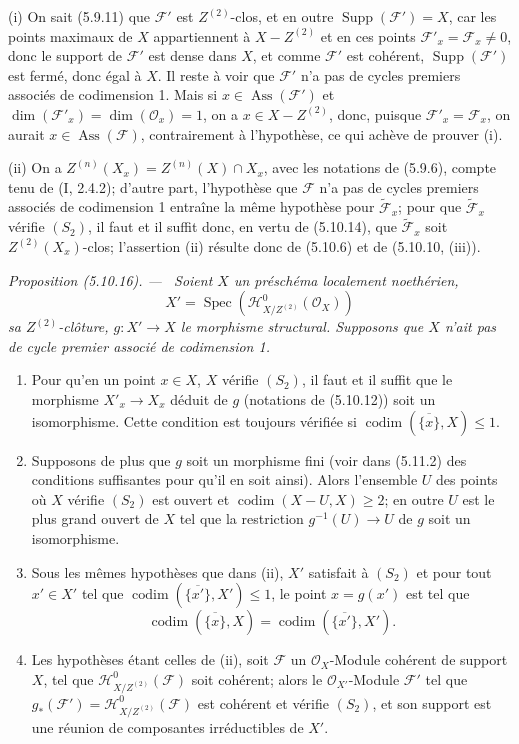 \documentclass[10pt,oneside]{book}
\newenvironment{proposition}[1][]{%
  \par\medskip\noindent\itshape Proposition (#1). ---\ }{\par}
\begin{document}
(i) On sait (5.9.11) que $\mathcal F'$ est $Z^{(2)}$-clos, et en outre
$\operatorname{Supp}(\mathcal F')=X$, car les points maximaux de $X$
appartiennent à $X-Z^{(2)}$ et en ces points
$\mathcal F'_x=\mathcal F_x\neq0$, donc le support de $\mathcal F'$ est dense
dans $X$, et comme $\mathcal F'$ est cohérent,
$\operatorname{Supp}(\mathcal F')$ est fermé, donc égal à $X$. Il reste à voir
que $\mathcal F'$ n'a pas de cycles premiers associés de codimension 1. Mais
si $x\in\operatorname{Ass}(\mathcal F')$ et
$\dim(\mathcal F'_x)=\dim(\mathcal O_x)=1$, on a $x\in X-Z^{(2)}$, donc,
puisque $\mathcal F'_x=\mathcal F_x$, on aurait
$x\in\operatorname{Ass}(\mathcal F)$, contrairement à l'hypothèse, ce qui
achève de prouver (i).

(ii) On a $Z^{(n)}(X_x)=Z^{(n)}(X)\cap X_x$, avec les notations de (5.9.6),
compte tenu de (I, 2.4.2); d'autre part, l'hypothèse que $\mathcal F$ n'a pas
de cycles premiers associés de codimension 1 entraîne la même hypothèse pour
$\widetilde{\mathcal F}_x$; pour que $\widetilde{\mathcal F}_x$ vérifie
$(S_2)$, il faut et il suffit donc, en vertu de (5.10.14), que
$\widetilde{\mathcal F}_x$ soit $Z^{(2)}(X_x)$-clos; l'assertion (ii) résulte
donc de (5.10.6) et de (5.10.10, (iii)).

\begin{proposition}[5.10.16]
\label{IV.2.s5.10.16-fr}
Soient $X$ un préschéma localement noethérien,
\[
X'=\operatorname{Spec}(\mathcal H^0_{X/Z^{(2)}}(\mathcal O_X))
\]
sa $Z^{(2)}$-clôture, $g:X'\to X$ le morphisme structural. Supposons que $X$
n'ait pas de cycle premier associé de codimension 1.
\begin{enumerate}
\item[(i)] Pour qu'en un point $x\in X$, $X$ vérifie $(S_2)$, il faut et il
suffit que le morphisme $X'_x\to X_x$ déduit de $g$ (notations de (5.10.12))
soit un isomorphisme. Cette condition est toujours vérifiée si
$\operatorname{codim}(\overline{\{x\}},X)\leq1$.
\item[(ii)] Supposons de plus que $g$ soit un morphisme fini (voir dans
(5.11.2) des conditions suffisantes pour qu'il en soit ainsi). Alors
l'ensemble $U$ des points où $X$ vérifie $(S_2)$ est ouvert et
$\operatorname{codim}(X-U,X)\geq2$; en outre $U$ est le plus grand ouvert de
$X$ tel que la restriction $g^{-1}(U)\to U$ de $g$ soit un isomorphisme.
\item[(iii)] Sous les mêmes hypothèses que dans (ii), $X'$ satisfait à $(S_2)$
et pour tout $x'\in X'$ tel que\linebreak
$\operatorname{codim}(\overline{\{x'\}},X')\leq1$, le point $x=g(x')$ est tel
que
\[
\operatorname{codim}(\overline{\{x\}},X)
=\operatorname{codim}(\overline{\{x'\}},X').
\]
\item[(iv)] Les hypothèses étant celles de (ii), soit $\mathcal F$ un
$\mathcal O_X$-Module cohérent de support $X$, tel que
$\mathcal H^0_{X/Z^{(2)}}(\mathcal F)$ soit cohérent; alors le
$\mathcal O_{X'}$-Module $\mathcal F'$ tel que
$g_*(\mathcal F')=\mathcal H^0_{X/Z^{(2)}}(\mathcal F)$ est cohérent et
vérifie $(S_2)$, et son support est une réunion de composantes irréductibles de
$X'$.
\end{enumerate}
\end{proposition}
\end{document}
